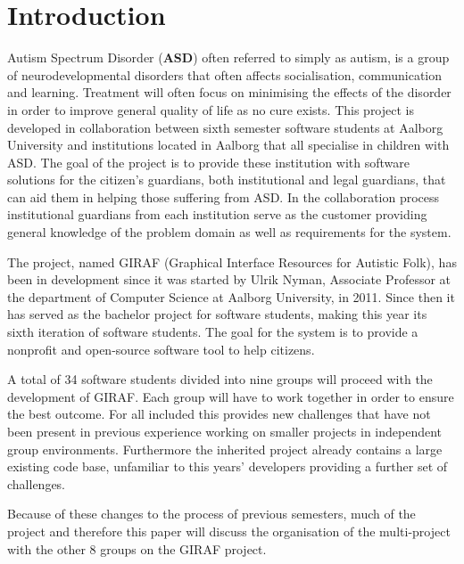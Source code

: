 \chapter{Introduction}
Autism Spectrum Disorder (\textbf{ASD}) often referred to simply as autism, is a 
group of neurodevelopmental disorders that often affects socialisation, communication and learning.
Treatment will often focus on minimising the effects of the disorder in order to improve general quality of life as no cure exists.
This project is developed in collaboration between sixth semester software students at Aalborg University and institutions located in Aalborg that all specialise in children with ASD.
The goal of the project is to provide these institution with software solutions for the citizen's guardians, both institutional and legal guardians, that can aid them in helping those suffering from ASD.
In the collaboration process institutional guardians from each institution serve as the customer providing general knowledge of the problem domain as well as requirements for the system.

The project, named GIRAF (Graphical Interface Resources for Autistic Folk), has been in development since it was started by Ulrik Nyman, Associate Professor at the department of Computer Science at Aalborg University, in 2011. 
Since then it has served as the bachelor project for software students, making this year its sixth iteration of software students.
The goal for the system is to provide a nonprofit and open-source software tool to help citizens.

A total of 34 software students divided into nine groups will proceed with the development of GIRAF.
Each group will have to work together in order to ensure the best outcome.
For all included this provides new challenges that have not been present in previous experience working on smaller projects in independent group environments.
Furthermore the inherited project already contains a large existing code base, unfamiliar to this years' developers providing a further set of challenges.

Because of these changes to the process of previous semesters, much of the project and therefore this paper will discuss the organisation of the multi-project with the other 8 groups on the GIRAF project.